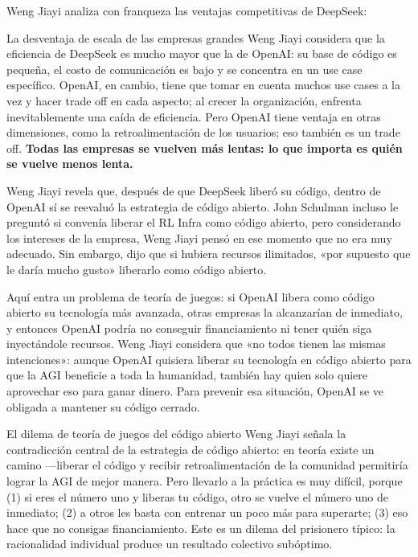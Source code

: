 \documentclass[a4paper]{article}
\begin{document}
Weng Jiayi analiza con franqueza las ventajas competitivas de DeepSeek:

\begin{warningbox}{La desventaja de escala de las empresas grandes}
Weng Jiayi considera que la eficiencia de DeepSeek es mucho mayor que la de OpenAI: su base de código es pequeña, el costo de comunicación es bajo y se concentra en un use case específico. OpenAI, en cambio, tiene que tomar en cuenta muchos use cases a la vez y hacer trade off en cada aspecto; al crecer la organización, enfrenta inevitablemente una caída de eficiencia. Pero OpenAI tiene ventaja en otras dimensiones, como la retroalimentación de los usuarios; eso también es un trade off. \textbf{Todas las empresas se vuelven más lentas: lo que importa es quién se vuelve menos lenta.}
\end{warningbox}

Weng Jiayi revela que, después de que DeepSeek liberó su código, dentro de OpenAI sí se reevaluó la estrategia de código abierto. John Schulman incluso le preguntó si convenía liberar el RL Infra como código abierto, pero considerando los intereses de la empresa, Weng Jiayi pensó en ese momento que no era muy adecuado. Sin embargo, dijo que si hubiera recursos ilimitados, «por supuesto que le daría mucho gusto» liberarlo como código abierto.

Aquí entra un problema de teoría de juegos: si OpenAI libera como código abierto su tecnología más avanzada, otras empresas la alcanzarían de inmediato, y entonces OpenAI podría no conseguir financiamiento ni tener quién siga inyectándole recursos. Weng Jiayi considera que «no todos tienen las mismas intenciones»: aunque OpenAI quisiera liberar su tecnología en código abierto para que la AGI beneficie a toda la humanidad, también hay quien solo quiere aprovechar eso para ganar dinero. Para prevenir esa situación, OpenAI se ve obligada a mantener su código cerrado.

\begin{knowledgebox}{El dilema de teoría de juegos del código abierto}
Weng Jiayi señala la contradicción central de la estrategia de código abierto: en teoría existe un camino —liberar el código y recibir retroalimentación de la comunidad permitiría lograr la AGI de mejor manera. Pero llevarlo a la práctica es muy difícil, porque (1) si eres el número uno y liberas tu código, otro se vuelve el número uno de inmediato; (2) a otros les basta con entrenar un poco más para superarte; (3) eso hace que no consigas financiamiento. Este es un dilema del prisionero típico: la racionalidad individual produce un resultado colectivo subóptimo.
\end{knowledgebox}
\end{document}
